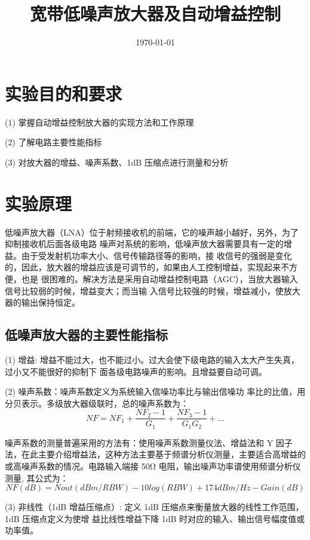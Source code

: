 \documentclass{../source/Experiment}
\title{宽带低噪声放大器及自动增益控制}
\date{\today}
\begin{document}
    \section{实验目的和要求}
    (1) 掌握自动增益控制放大器的实现方法和工作原理
    
    (2) 了解电路主要性能指标
    
    (3) 对放大器的增益、噪声系数、1dB 压缩点进行测量和分析

    \section{实验原理}
    低噪声放大器（LNA）位于射频接收机的前端，它的噪声越小越好，另外，为了抑制接收机后面各级电路
    噪声对系统的影响，低噪声放大器需要具有一定的增益。由于受发射机功率大小、信号传输路径等的影响，接
    收信号的强弱是变化的，因此，放大器的增益应该是可调节的，如果由人工控制增益，实现起来不方便，也是
    很困难的。解决方法是采用自动增益控制电路（AGC），当放大器输入信号比较弱的时候，增益变大；而当输
    入信号比较强的时候，增益减小，使放大器的输出保持恒定。

        \subsection{低噪声放大器的主要性能指标}

        (1) 增益: 增益不能过大，也不能过小。过大会使下级电路的输入太大产生失真，过小又不能很好的抑制下
        面各级电路噪声的影响。且增益要自动可调。
        
        (2) 噪声系数：噪声系数定义为系统输入信噪功率比与输出信噪功
        率比的比值，用分贝表示。多级放大器级联时，总的噪声系数为：
        $$NF = NF_1 + \frac{NF_2 -1}{G_1} + \frac{NF_3 - 1}{G_1G_2} + \dots $$
        
        噪声系数的测量普遍采用的方法有：使用噪声系数测量仪法、增益法和 Y 因子法，在此主要介绍增益法，这种方法主要基于频谱分析仪测量，主要适合高增益的或高噪声系数的情况。电路输入端接 50Ω
        电阻，输出噪声功率谱使用频谱分析仪测量, 其公式为：
        $$NF(dB) = Nout(dBm/RBW) − 10 log(RBW) + 174dBm/Hz − Gain(dB)$$

        (3) 非线性（1dB 增益压缩点）: 定义 1dB 压缩点来衡量放大器的线性工作范围，1dB 压缩点定义为使增
        益比线性增益下降 1dB 时对应的输入、输出信号幅度值或功率值。
\end{document}
